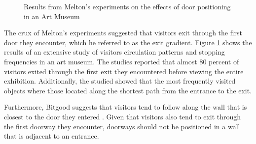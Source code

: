 \documentclass[12pt]{ucthesis}
\begin{document}
\begin{figure}[H]
 \centering
 \hspace{10 mm}
 \label{melton}
 \caption{Results from Melton's experiments on the effects of door positioning in an Art Museum}
\label{Melton-studies}
\end{figure}

The crux of Melton's experiments suggested that visitors exit through the first door they encounter, which he referred to as the exit gradient. Figure \ref{Melton-studies} shows the results of an extensive study of visitors circulation patterns and stopping frequencies in an art museum. The studies reported that almost 80 percent of visitors exited through the first exit they encountered before viewing the entire exhibition. Additionally, the studied showed that the most frequently visited objects where those located along the shortest path from the entrance to the exit. 

Furthermore, Bitgood suggests that visitors tend to follow along the wall that is closest to the door they entered \cite{Bitgood95}. Given that visitors also tend to exit through the first doorway they encounter, doorways should not be positioned in a wall that is adjacent to an entrance. 
\end{document}
